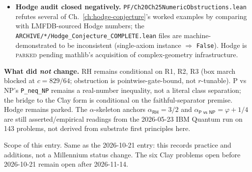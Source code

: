 \begin{itemize}
\item \textbf{Hodge audit closed negatively.}
\texttt{PF/Ch20Ch25NumericObstructions.lean} refutes several of
Ch.~\ref{ch:hodge-conjecture}'s worked examples by comparing with
LMFDB-sourced Hodge numbers; the \texttt{ARCHIVE/*/Hodge\_Conjecture\_COMPLETE.lean}
files are machine-demonstrated to be inconsistent (single-axiom
instance $\Rightarrow$ \texttt{False}).  Hodge is \textsc{parked}
pending mathlib's acquisition of complex-geometry infrastructure.
\end{itemize}

\noindent\textbf{What did \emph{not} change.}  RH remains conditional
on R1, R2, R3 (box march blocked at $c = 829/64$; obstruction is
pointwise-gate-bound, not $r$-tunable).  P vs NP's
\texttt{P\_neq\_NP} remains a real-number inequality, not a literal
class separation; the bridge to the Clay form is conditional on the
faithful-separator premise.  Hodge remains parked.  The
$\alpha$-skeleton anchors $\alpha_{\textsf{RH}} = 3/2$ and
$\alpha_{\textsf{P vs NP}} = \varphi + 1/4$ are still
asserted/empirical readings from the 2026-05-23 IBM Quantum run on
143 problems, not derived from substrate first principles here.

\noindent Scope of this entry.  Same as the 2026-10-21 entry: this
records practice and additions, not a Millennium status change.  The
six Clay problems open before 2026-10-21 remain open after
2026-11-14.
